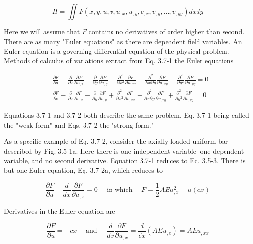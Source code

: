 \documentclass[10pt]{article}
\begin{document}
\begin{equation*}
\Pi=\iint F\left(x, y, u, v, u_{,x}, u_{,y}, v_{,x}, v_{,y}, \ldots, v_{,yy}\right) d x d y \tag{3.7-1}
\end{equation*}

Here we will assume that $F$ contains no derivatives of order higher than second. There are as many "Euler equations" as there are dependent field variables. An Euler equation is a governing differential equation of the physical problem. Methods of calculus of variations extract from Eq. 3.7-1 the Euler equations

\begin{align*}
& \frac{\partial F}{\partial u}-\frac{\partial}{\partial x} \frac{\partial F}{\partial u_{,x}}-\frac{\partial}{\partial y} \frac{\partial F}{\partial u_{,y}}+\frac{\partial^{2}}{\partial x^{2}} \frac{\partial F}{\partial u_{,x x}}+\frac{\partial^{2}}{\partial x \partial y} \frac{\partial F}{\partial u_{,x y}}+\frac{\partial^{2}}{\partial y^{2}} \frac{\partial F}{\partial u_{,y y}}=0  \tag{3.7-2a}\\
& \frac{\partial F}{\partial v}-\frac{\partial}{\partial x} \frac{\partial F}{\partial v_{,x}}-\frac{\partial}{\partial y} \frac{\partial F}{\partial v_{,y}}+\frac{\partial^{2}}{\partial x^{2}} \frac{\partial F}{\partial v_{,x x}}+\frac{\partial^{2}}{\partial x \partial y} \frac{\partial F}{\partial v_{,xy}}+\frac{\partial^{2}}{\partial y^{2}} \frac{\partial F}{\partial v_{,yy}}=0 \tag{3.7-2b}
\end{align*}

Equations 3.7-1 and 3.7-2 both describe the same problem, Eq. 3.7-1 being called the "weak form" and Eqs. 3.7-2 the "strong form."

As a specific example of Eq. 3.7-2, consider the axially loaded uniform bar described by Fig. 3.5-1a. Here there is one independent variable, one dependent variable, and no second derivative. Equation 3.7-1 reduces to Eq. 3.5-3. There is but one Euler equation, Eq. 3.7-2a, which reduces to

\begin{equation*}
\frac{\partial F}{\partial u}-\frac{d}{d x} \frac{\partial F}{\partial u_{, x}}=0 \quad \text { in which } \quad F=\frac{1}{2} A E u_{, x}^{2}-u(c x) \tag{3.7-3}
\end{equation*}

Derivatives in the Euler equation are

\begin{equation*}
\frac{\partial F}{\partial u}=-c x \quad \text { and } \quad \frac{d}{d x} \frac{\partial F}{\partial u_{, x}}=\frac{d}{d x}\left(A E u_{, x}\right)=A E u_{, x x} \tag{3.7-4}
\end{equation*}
\end{document}
